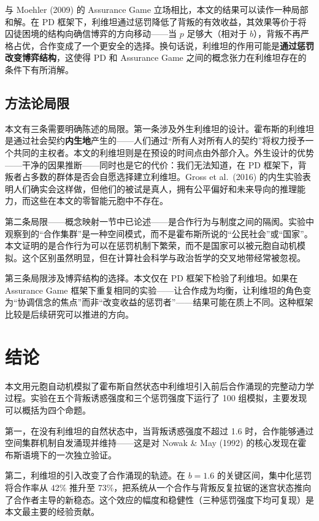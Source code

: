 \documentclass[12pt,a4paper]{ctexart}
\begin{document}
与 Moehler (2009) 的 Assurance Game 立场相比，本文的结果可以读作一种局部和解。在 PD 框架下，利维坦通过惩罚降低了背叛的有效收益，其效果等价于将囚徒困境的结构向确信博弈的方向移动——当 $p$ 足够大（相对于 $b$），背叛不再严格占优，合作变成了一个更安全的选择。换句话说，利维坦的作用可能是\textbf{通过惩罚改变博弈结构}，这使得 PD 和 Assurance Game 之间的概念张力在利维坦存在的条件下有所消解。

\subsection{方法论局限}

本文有三条需要明确陈述的局限。第一条涉及外生利维坦的设计。霍布斯的利维坦是通过社会契约\textbf{内生地}产生的——人们通过“所有人对所有人的契约”将权力授予一个共同的主权者。本文的利维坦则是在预设的时间点由外部介入。外生设计的优势——干净的因果推断——同时也是它的代价：我们无法知道，在 PD 框架下，背叛者占多数的群体是否会自愿选择建立利维坦。Gross et al.\ (2016) 的内生实验表明人们确实会这样做，但他们的被试是真人，拥有公平偏好和未来导向的推理能力，而这些在本文的零智能元胞中不存在。

第二条局限——概念映射一节中已论述——是合作行为与制度之间的隔阂。实验中观察到的“合作集群”是一种空间模式，而不是霍布斯所说的“公民社会”或“国家”。本文证明的是合作行为可以在惩罚机制下繁荣，而不是国家可以被元胞自动机模拟。这个区别虽然明显，但在计算社会科学与政治哲学的交叉地带经常被忽视。

第三条局限涉及博弈结构的选择。本文仅在 PD 框架下检验了利维坦。如果在 Assurance Game 框架下重复相同的实验——让合作成为均衡，让利维坦的角色变为“协调信念的焦点”而非“改变收益的惩罚者”——结果可能在质上不同。这种框架比较是后续研究可以推进的方向。

\section{结论}

本文用元胞自动机模拟了霍布斯自然状态中利维坦引入前后合作涌现的完整动力学过程。实验在五个背叛诱惑强度和三个惩罚强度下运行了 100 组模拟，主要发现可以概括为四个命题。

第一，在没有利维坦的自然状态中，当背叛诱惑强度不超过 1.6 时，合作能够通过空间集群机制自发涌现并维持——这是对 Nowak \& May (1992) 的核心发现在霍布斯语境下的一次独立验证。

第二，利维坦的引入改变了合作涌现的轨迹。在 $b=1.6$ 的关键区间，集中化惩罚将合作率从 42\% 推升至 73\%，把系统从一个合作与背叛反复拉锯的迷宫状态推向了合作者主导的新稳态。这个效应的幅度和稳健性（三种惩罚强度下均可复现）是本文最主要的经验贡献。
\end{document}

